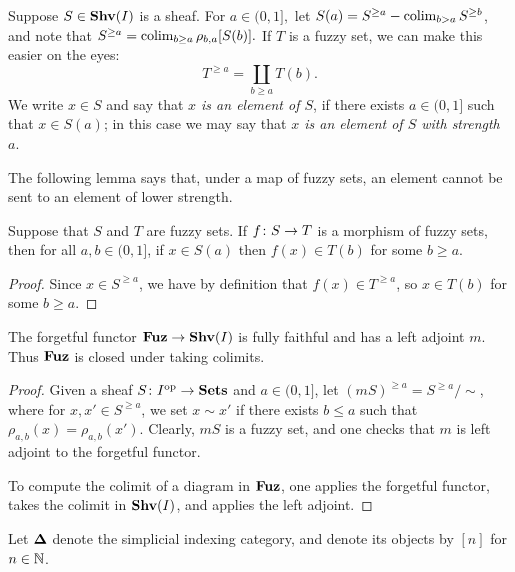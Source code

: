 \documentclass{amsart}
\def\Shv{\She}
\def\bD{{\bf \Delta}}
\def\Fuz{{\bf Fuz}}
\begin{document}
Suppose $S\in\Shv(I)$ is a sheaf.   For $a\in (0,1],$ let $S(a)=S^{\geq a}-\mathop{\textnormal{colim}}_{b>a}S^{\geq b}$, and note that $S^{\geq a}=\mathop{\textnormal{colim}}_{b\geq a}\rho_{b,a}[S(b)].$  If $T$ is a fuzzy set, we can make this easier on the eyes: $$T^{\geq a}=\coprod_{b\geq a}T(b).$$  We write $x\in S$ and say that {\em $x$ is an element of $S$}, if there exists $a\in (0,1]$ such that $x\in S(a)$; in this case we may say that {\em $x$ is an element of $S$ with strength $a$}.

The following lemma says that, under a map of fuzzy sets, an element cannot be sent to an element of lower strength.

\begin{lemma}

Suppose that $S$ and $T$ are fuzzy sets.  If $f\colon S\rightarrow T$ is a morphism of fuzzy sets, then for all $a,b\in (0,1]$, if $x\in S(a)$ then $f(x)\in T(b)$ for some $b\geq a$.

\end{lemma}

\begin{proof}

Since $x\in S^{\geq a}$, we have by definition that $f(x)\in T^{\geq a}$, so $x\in T(b)$ for some $b\geq a$.

\end{proof}

\begin{lemma}

The forgetful functor $\Fuz\to\Shv(I)$ is fully faithful and has a left adjoint $m$.  Thus $\Fuz$ is closed under taking colimits.

\end{lemma}

\begin{proof}

Given a sheaf $S\colon I^\textnormal{op}\rightarrow{\bf Sets}$ and $a\in (0,1]$, let $(mS)^{\geq a}=S^{\geq a}/\sim$, where for $x,x'\in S^{\geq a}$, we set $x\sim x'$ if there exists $b\leq a$ such that $\rho_{a,b}(x)=\rho_{a,b}(x')$.  Clearly, $mS$ is a fuzzy set, and one checks that $m$ is left adjoint to the forgetful functor.  

To compute the colimit of a diagram in $\Fuz$, one applies the forgetful functor, takes the colimit in $\Shv(I)$, and applies the left adjoint.

\end{proof}

Let $\bD$ denote the simplicial indexing category, and denote its objects by $[n]$ for $n\in{\mathbb N}$.
\end{document}
